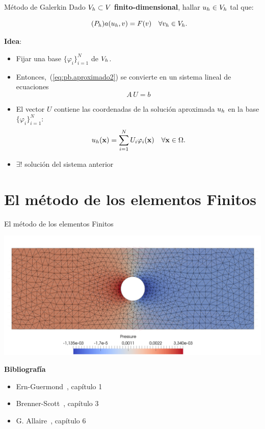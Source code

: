 \documentclass[9pt,leqno]{beamer}
\begin{document}
\begin{frame}{Método de Galerkin}
  Dado $V_h\subset V$ \textbf{finito-dimensional}, hallar $u_{h}\in V_h$ tal que:
  \begin{block}{}
    \vspace{-2.5ex}
    \begin{equation}
      \label{eq:pb.aproximado2}
      \tag{$P_h$}
      a(u_{h},v)= F(v) \quad \forall v_{h} \in V_h.
    \end{equation}
  \end{block}

  \textbf{Idea}:
  \begin{itemize}
  \item Fijar una base $\{\varphi_i\}_{i=1}^N$ de $V_h$.
  \item Entonces,~(\ref{eq:pb.aproximado2}) se convierte en un sistema
    lineal de ecuaciones
    $$A\, U = b$$
  \item El vector $U$ contiene las coordenadas de la solución
    aproximada $u_{h}$ en la base $\{\varphi_i\}_{i=1}^N$:
    $$
    u_{h}(\mathbf{x}) = \sum_{i=1}^N U_i \varphi_i(\mathbf{x})\quad\forall\mathbf{x}\in\Omega.
    $$
  \item $\exists!$ solución del sistema anterior
  \end{itemize}
\end{frame}

\section{El método de los elementos Finitos}

\begin{frame}{El método de los elementos Finitos}
  \begin{center}
    \includegraphics[width=0.99\linewidth]{mef}
  \end{center}
  \bigskip
  \textbf{Bibliografía}
  \small
  \begin{itemize}
  \item Ern-Guermond~\cite{Ern-Guermond:04}, capítulo 1
  \item Brenner-Scott~\cite{Brenner-Scott:08}, capítulo 3
  \item G. Allaire~\cite{allaire_numerical_2007}, capítulo 6
  \end{itemize}
\end{frame}
\end{document}
